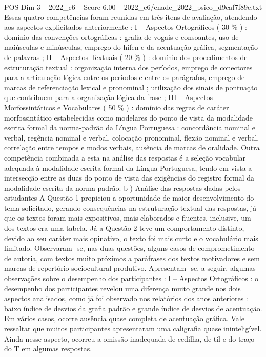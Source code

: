 \begin{textsample}{POS Dim 3 – 2022\_c6 – Score 6.00 – 2022\_c6/enade\_2022\_psico\_d9caf7f89c.txt}
Essas quatro competências foram reunidas em três itens de avaliação, atendendo aos aspectos explicitados anteriormente : I – Aspectos Ortográficos ( 30 \% ) : domínio das convenções ortográficas : grafia de vogais e consoantes, uso de maiúsculas e minúsculas, emprego do hífen e da acentuação gráfica, segmentação de palavras ; II – Aspectos Textuais ( 20 \% ) : domínio dos procedimentos de estruturação textual : organização interna dos períodos, emprego de conectores para a articulação lógica entre os períodos e entre os parágrafos, emprego de marcas de referenciação lexical e pronominal ; utilização dos sinais de pontuação que contribuem para a organização lógica da frase ; III – Aspectos Morfossintáticos e Vocabulares ( 50 \% ) : domínio das regras de caráter morfossintático estabelecidas como modelares do ponto de vista da modalidade escrita formal da norma-padrão da Língua Portuguesa : concordância nominal e verbal, regência nominal e verbal, colocação pronominal, flexão nominal e verbal, correlação entre tempos e modos verbais, ausência de marcas de oralidade.
Outra competência combinada a esta na análise das respostas é a seleção vocabular adequada à modalidade escrita formal da Língua Portuguesa, tendo em vista a intersecção entre as duas do ponto de vista das exigências do registro formal da modalidade escrita da norma-padrão. b ) Análise das respostas dadas pelos estudantes A Questão 1 propiciou a oportunidade de maior desenvolvimento do tema solicitado, gerando consequências na estruturação textual das respostas, já que os textos foram mais expositivos, mais elaborados e fluentes, inclusive, um dos textos era uma tabela.
Já a Questão 2 teve um comportamento distinto, devido ao seu caráter mais opinativo, o texto foi mais curto e o vocabulário mais limitado.
Observaram -se, nas duas questões, alguns casos de comprometimento de autoria, com textos muito próximos a paráfrases dos textos motivadores e sem marcas de repertório sociocultural produtivo.
Apresentam -se, a seguir, algumas observações sobre o desempenho dos participantes : I – Aspectos Ortográficos : o desempenho dos participantes revelou uma diferença muito grande nos dois aspectos analisados, como já foi observado nos relatórios dos anos anteriores : baixo índice de desvios da grafia padrão e grande índice de desvios de acentuação.
Em vários casos, ocorre ausência quase completa de acentuação gráfica.
Vale ressaltar que muitos participantes apresentaram uma caligrafia quase ininteligível.
Ainda nesse aspecto, ocorreu a omissão inadequada de cedilha, de til e do traço do T em algumas respostas.

\end{textsample}
